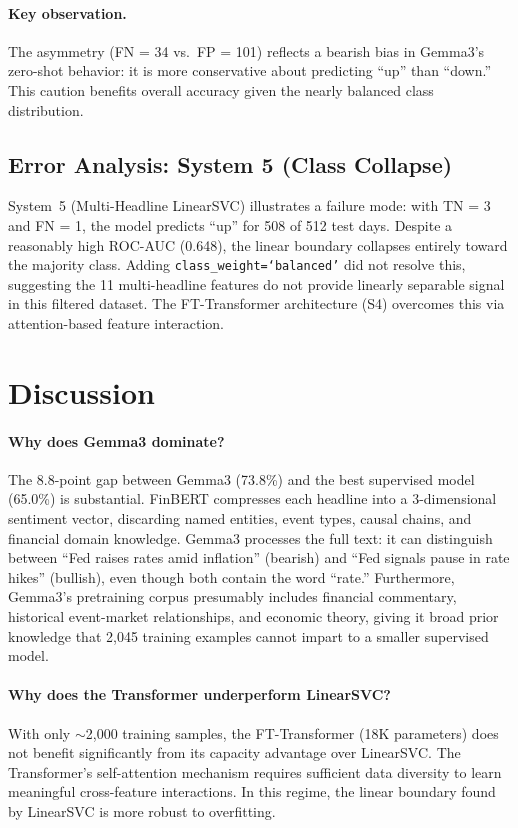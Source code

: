 \documentclass[11pt]{article}
\begin{document}
\paragraph{Key observation.} The asymmetry (FN = 34 vs.\ FP = 101) reflects a bearish bias in Gemma3's zero-shot behavior: it is more conservative about predicting ``up'' than ``down.'' This caution benefits overall accuracy given the nearly balanced class distribution.

\subsection{Error Analysis: System 5 (Class Collapse)}

System~5 (Multi-Headline LinearSVC) illustrates a failure mode: with TN = 3 and FN = 1, the model predicts ``up'' for 508 of 512 test days. Despite a reasonably high ROC-AUC (0.648), the linear boundary collapses entirely toward the majority class. Adding \texttt{class\_weight=`balanced'} did not resolve this, suggesting the 11 multi-headline features do not provide linearly separable signal in this filtered dataset. The FT-Transformer architecture (S4) overcomes this via attention-based feature interaction.

\section{Discussion}
\label{sec:discussion}

\paragraph{Why does Gemma3 dominate?} The 8.8-point gap between Gemma3 (73.8\%) and the best supervised model (65.0\%) is substantial. FinBERT compresses each headline into a 3-dimensional sentiment vector, discarding named entities, event types, causal chains, and financial domain knowledge. Gemma3 processes the full text: it can distinguish between ``Fed raises rates amid inflation'' (bearish) and ``Fed signals pause in rate hikes'' (bullish), even though both contain the word ``rate.'' Furthermore, Gemma3's pretraining corpus presumably includes financial commentary, historical event-market relationships, and economic theory, giving it broad prior knowledge that 2,045 training examples cannot impart to a smaller supervised model.

\paragraph{Why does the Transformer underperform LinearSVC?} With only $\sim$2,000 training samples, the FT-Transformer (18K parameters) does not benefit significantly from its capacity advantage over LinearSVC. The Transformer's self-attention mechanism requires sufficient data diversity to learn meaningful cross-feature interactions. In this regime, the linear boundary found by LinearSVC is more robust to overfitting.
\end{document}
